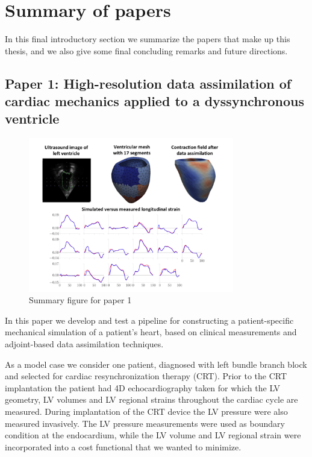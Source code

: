 
\section{Summary of papers}
\label{sec:summary}
In this final introductory section we summarize the papers that make
up this thesis, and we also give some final concluding remarks
and future directions. 

\subsection{Paper 1: High-resolution data assimilation of cardiac mechanics
  applied to a dyssynchronous ventricle}



\begin{figure}[htbp]
  \centering
    \includegraphics[width=0.8\textwidth]{chapters/introduction/figures/paper1}
\caption{Summary figure for paper 1}
\label{fig:paper1}
\end{figure}


In this paper we develop and test a pipeline for constructing a
patient-specific mechanical simulation of a patient's heart, based on
clinical measurements and adjoint-based data assimilation
techniques.

As a model case we consider one patient, diagnosed with
left bundle branch block and selected for cardiac resynchronization
therapy (CRT). Prior to the CRT implantation the patient had 4D
echocardiography taken for which the LV geometry, LV volumes and LV
regional strains throughout the cardiac cycle are measured. During
implantation of the CRT device the LV pressure were also measured
invasively. The LV pressure measurements were used as boundary condition at the
endocardium, while the LV volume and LV regional strain were incorporated
into a cost functional that we wanted to minimize.


